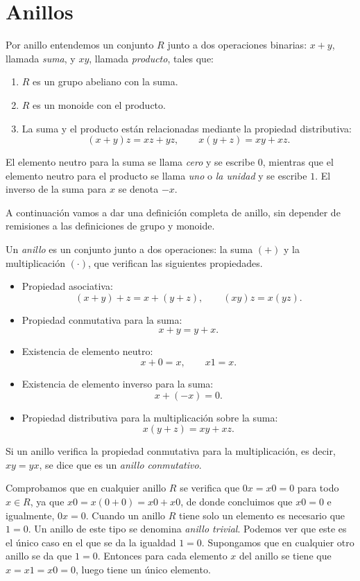 \section{Anillos}

Por anillo entendemos un conjunto \(R\) junto a dos operaciones binarias: \(x + y\), llamada \textit{suma}, y \(xy\), llamada \textit{producto}, tales que:
\begin{enumerate}
  \item \(R\) es un grupo abeliano con la suma.
  \item \(R\) es un monoide con el producto.
  \item La suma y el producto están relacionadas mediante la propiedad distributiva:
  \[
    (x+y)z = xz + yz, \qquad x(y+z) = xy + xz.
  \]
\end{enumerate}
El elemento neutro para la suma se llama \textit{cero} y se escribe \(0\), mientras que el elemento neutro para el producto se llama \textit{uno} o \textit{la unidad} y se escribe \(1\).
El inverso de la suma para \(x\) se denota \(-x\).

A continuación vamos a dar una definición completa de anillo, sin depender de remisiones a las definiciones de grupo y monoide.

\begin{definition}
  Un \textit{anillo} es un conjunto junto a dos operaciones: la suma \((+)\) y la multiplicación \((\cdot)\), que verifican las siguientes propiedades.
  \begin{itemize}[itemsep=0pt]
    \item Propiedad asociativa:
    \[(x+y)+z = x + (y+z), \qquad (xy)z = x(yz).\]
    \item Propiedad conmutativa para la suma:
    \[x + y = y + x.\]
    \item Existencia de elemento neutro:
    \[x + 0 = x, \qquad x1 = x.\]
    \item Existencia de elemento inverso para la suma:
    \[x + (-x) = 0.\]
    \item Propiedad distributiva para la multiplicación sobre la suma:
    \[x(y+z) = xy + xz.\]
  \end{itemize}

  Si un anillo verifica la propiedad conmutativa para la multiplicación, es decir, \(xy = yx\), se dice que es un \textit{anillo conmutativo}.
\end{definition}

Comprobamos que en  cualquier anillo \(R\) se verifica que \(0x = x0 = 0\) para todo \(x \in R\), ya que \(x0 = x(0+0) = x0 + x0\), de donde concluimos que \(x0 = 0\) e igualmente, \(0x = 0\).
Cuando un anillo \(R\) tiene solo un elemento es necesario que \(1 = 0\).
Un anillo de este tipo se denomina \textit{anillo trivial}.
Podemos ver que este es el único caso en el que se da la igualdad \(1 = 0\).
Supongamos que en cualquier otro anillo se da que \(1 = 0\). 
Entonces para cada elemento \(x\) del anillo se tiene que \(x = x1 = x0 = 0\), luego tiene un único elemento.

